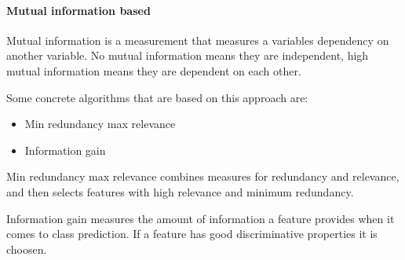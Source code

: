 \paragraph{Mutual information based}
\label{par:methods.flat.filter.mutual_information}

  
Mutual information is a measurement that measures a variables dependency on
another variable. No mutual information means they are independent, high mutual
information means they are dependent on each other.

Some concrete algorithms that are based on this approach are:
\begin{itemize}
  \item Min redundancy max relevance
  \item Information gain
\end{itemize}

Min redundancy max relevance combines measures for redundancy and relevance, and
then selects features with high relevance and minimum redundancy.

Information gain measures the amount of information a feature provides when it
comes to class prediction. If a feature has good discriminative properties it is
choosen.